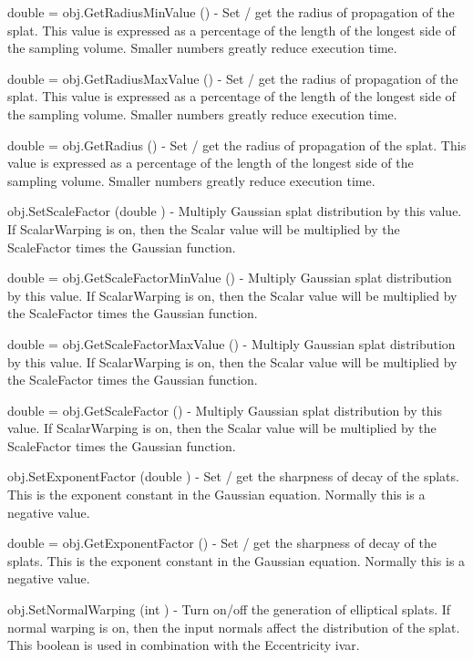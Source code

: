 \begin{DoxyItemize}
\item {\ttfamily double = obj.\-Get\-Radius\-Min\-Value ()} -\/ Set / get the radius of propagation of the splat. This value is expressed as a percentage of the length of the longest side of the sampling volume. Smaller numbers greatly reduce execution time.  
\item {\ttfamily double = obj.\-Get\-Radius\-Max\-Value ()} -\/ Set / get the radius of propagation of the splat. This value is expressed as a percentage of the length of the longest side of the sampling volume. Smaller numbers greatly reduce execution time.  
\item {\ttfamily double = obj.\-Get\-Radius ()} -\/ Set / get the radius of propagation of the splat. This value is expressed as a percentage of the length of the longest side of the sampling volume. Smaller numbers greatly reduce execution time.  
\item {\ttfamily obj.\-Set\-Scale\-Factor (double )} -\/ Multiply Gaussian splat distribution by this value. If Scalar\-Warping is on, then the Scalar value will be multiplied by the Scale\-Factor times the Gaussian function.  
\item {\ttfamily double = obj.\-Get\-Scale\-Factor\-Min\-Value ()} -\/ Multiply Gaussian splat distribution by this value. If Scalar\-Warping is on, then the Scalar value will be multiplied by the Scale\-Factor times the Gaussian function.  
\item {\ttfamily double = obj.\-Get\-Scale\-Factor\-Max\-Value ()} -\/ Multiply Gaussian splat distribution by this value. If Scalar\-Warping is on, then the Scalar value will be multiplied by the Scale\-Factor times the Gaussian function.  
\item {\ttfamily double = obj.\-Get\-Scale\-Factor ()} -\/ Multiply Gaussian splat distribution by this value. If Scalar\-Warping is on, then the Scalar value will be multiplied by the Scale\-Factor times the Gaussian function.  
\item {\ttfamily obj.\-Set\-Exponent\-Factor (double )} -\/ Set / get the sharpness of decay of the splats. This is the exponent constant in the Gaussian equation. Normally this is a negative value.  
\item {\ttfamily double = obj.\-Get\-Exponent\-Factor ()} -\/ Set / get the sharpness of decay of the splats. This is the exponent constant in the Gaussian equation. Normally this is a negative value.  
\item {\ttfamily obj.\-Set\-Normal\-Warping (int )} -\/ Turn on/off the generation of elliptical splats. If normal warping is on, then the input normals affect the distribution of the splat. This boolean is used in combination with the Eccentricity ivar.  

\end{DoxyItemize}
